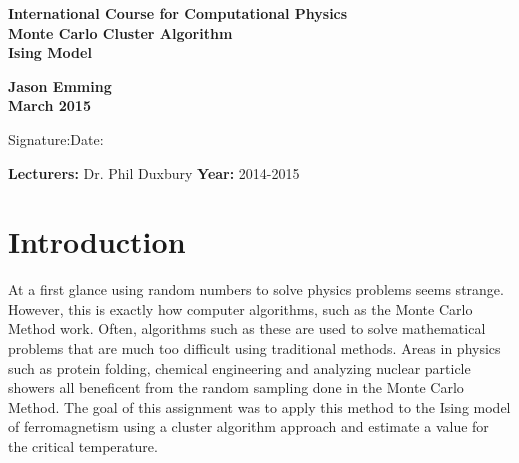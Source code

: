 \documentclass[a4paper,twoside,12pt]{article}
\begin{document}
\pagestyle{empty}                       							%
\vspace*{2cm}
\begin{center}
        \Large\bf International Course for Computational Physics\\[10pt]%
        \LARGE\bf Monte Carlo Cluster Algorithm\\	         		%
       \bf Ising Model\\
\end{center}
\vspace*{0.5cm}
\begin{center}
        \bf Jason Emming\\ 									%
        March 2015                                    						%
\end{center}
\vspace*{5mm}

\vspace*{2cm}
Signature:\hspace*{8cm}Date:

\vfill
{\bf Lecturers:} Dr. Phil Duxbury        					
\hfill
\textbf{Year:} 2014-2015                 					
\newpage
\pagestyle{plain}                               					%
\tableofcontents                                					%

\pagebreak

\setcounter{page}{1}                         					%

\section{Introduction}
At a first glance using random numbers to solve physics problems seems strange. However, this is exactly how computer algorithms, such as the Monte Carlo Method work. Often, algorithms such as these are used to solve mathematical problems that are much too difficult using traditional methods. Areas in physics such as protein folding, chemical engineering and analyzing nuclear particle showers all beneficent from the random sampling done in the Monte Carlo Method. The goal of this assignment was to apply this method to the Ising model of ferromagnetism using a cluster algorithm approach and estimate a value for the critical temperature.  
\end{document}
